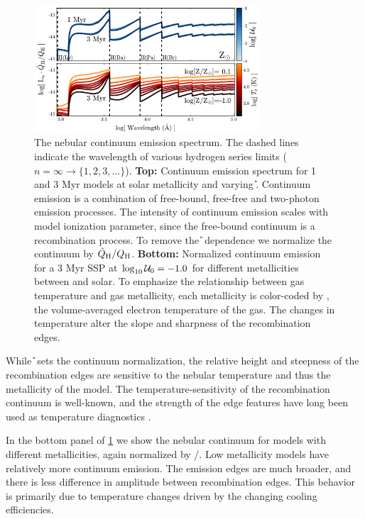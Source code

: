 \begin{figure}[!htbp]
 \begin{centering}
    \includegraphics[width=0.75\textwidth]{manuscript/chapter2/f10.pdf}
    \caption{The nebular continuum emission spectrum. The dashed lines indicate the wavelength of various hydrogen series limits ($n=\infty \rightarrow \{1,2,3,\ldots\}$). \textbf{Top:} Continuum emission spectrum for 1 and 3 Myr models at solar metallicity and varying \U{}. Continuum emission is a combination of free-bound, free-free and two-photon emission processes. The intensity of continuum emission scales with model ionization parameter, since the free-bound continuum is a recombination process. To remove the \U{} dependence we normalize the continuum by $\hat{Q}_{\mathrm{H}}/Q_{\mathrm{H}}$. \textbf{Bottom:} Normalized continuum emission for a 3 Myr SSP at $\log_{10} \mathcal{U}_0=-1.0$ for different metallicities between  and solar. To emphasize the relationship between gas temperature and gas metallicity, each metallicity is color-coded by \Te{}, the volume-averaged electron temperature of the gas. The changes in temperature alter the slope and sharpness of the recombination edges.}
    \label{fig:nebCont}
 \end{centering}
\end{figure}

While \U{} sets the continuum normalization, the relative height and steepness of the recombination edges are sensitive to the nebular temperature and thus the metallicity of the model. The temperature-sensitivity of the recombination continuum is well-known, and the strength of the edge features have long been used as temperature diagnostics \citep[e.g.,][]{Peimbert67}.

In the bottom panel of \ref{fig:nebCont} we show the nebular continuum for models with different metallicities, again normalized by \QHat{}/\QH{}. Low metallicity models have relatively more continuum emission. The emission edges are much broader, and there is less difference in amplitude between recombination edges. This behavior is primarily due to temperature changes driven by the changing cooling efficiencies.

